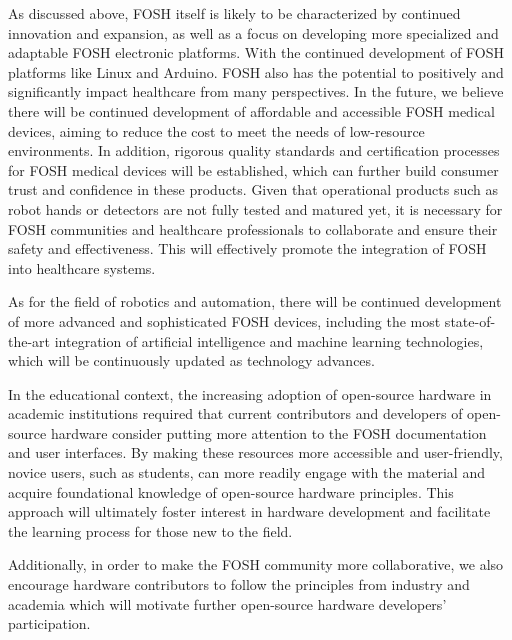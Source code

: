 \documentclass[final-report.tex]{subfiles}
\begin{document}

As discussed above, FOSH itself is likely to be characterized by continued innovation and expansion, as well as a focus on developing more specialized and adaptable FOSH electronic platforms. With the continued development of FOSH platforms like Linux and Arduino. FOSH also has the potential to positively and significantly impact healthcare from many perspectives. In the future, we believe there will be continued development of affordable and accessible FOSH medical devices, aiming to reduce the cost to meet the needs of low-resource environments. In addition, rigorous quality standards and certification processes for FOSH medical devices will be established, which can further build consumer trust and confidence in these products. Given that operational products such as robot hands or detectors are not fully tested and matured yet, it is necessary for FOSH communities and healthcare professionals to collaborate and ensure their safety and effectiveness. This will effectively promote the integration of FOSH into healthcare systems.

As for the field of robotics and automation, there will be continued development of more advanced and sophisticated FOSH devices, including the most state-of-the-art integration of artificial intelligence and machine learning technologies, which will be continuously updated as technology advances. 

In the educational context, the increasing adoption of open-source hardware in academic institutions required that current contributors and developers of open-source hardware consider putting more attention to the FOSH documentation and user interfaces. By making these resources more accessible and user-friendly, novice users, such as students, can more readily engage with the material and acquire foundational knowledge of open-source hardware principles. This approach will ultimately foster interest in hardware development and facilitate the learning process for those new to the field.

Additionally, in order to make the FOSH community more collaborative, we also encourage hardware contributors to follow the principles from industry and academia which will motivate further open-source hardware developers' participation. 
\end{document}
